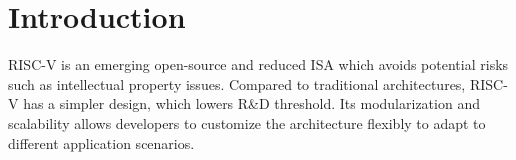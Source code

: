\documentclass[sigconf,screen,review,anonymous]{acmart}
\begin{document}



\maketitle

\section{Introduction}
RISC-V is an emerging open-source and reduced ISA which avoids potential risks such as intellectual property issues.
Compared to traditional architectures, RISC-V has a simpler design, which lowers R\&D threshold.
Its modularization and scalability allows developers to customize the architecture flexibly to adapt to different application scenarios.
\end{document}
